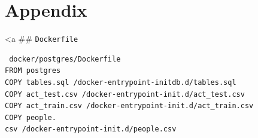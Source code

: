 \documentclass[]{report}
\begin{document}
\chapter{Appendix}\label{appendix}

\textless{}a \#\# \texttt{Dockerfile}

\begin{verbatim}
 docker/postgres/Dockerfile
FROM postgres
COPY tables.sql /docker-entrypoint-initdb.d/tables.sql
COPY act_test.csv /docker-entrypoint-init.d/act_test.csv
COPY act_train.csv /docker-entrypoint-init.d/act_train.csv
COPY people.
csv /docker-entrypoint-init.d/people.csv
\end{verbatim}

\section{}\label{section}
\end{document}
